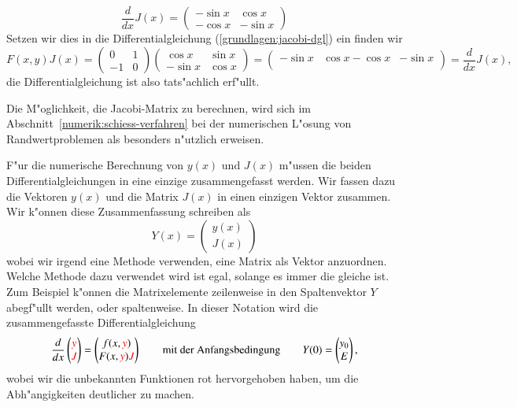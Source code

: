 \begin{beispiel}
\[
\frac{d}{dx}J(x)
=
\begin{pmatrix}
-\sin x& \cos x\\
-\cos x&-\sin x
\end{pmatrix}
\]
Setzen wir dies in die Differentialgleichung (\ref{grundlagen:jacobi-dgl}) ein
finden wir
\[
F(x,y)J(x)
=
\begin{pmatrix}
 0&1\\
-1&0
\end{pmatrix}
\begin{pmatrix}
 \cos x&\sin x\\
-\sin x&\cos x
\end{pmatrix}
=
\begin{pmatrix}
-\sin x& \cos x
-\cos x&-\sin x\\
\end{pmatrix}
=
\frac{d}{dx}J(x),
\]
die Differentialgleichung ist also tats"achlich erf"ullt.
\end{beispiel}
Die M"oglichkeit, die Jacobi-Matrix zu berechnen, wird sich im
Abschnitt~\ref{numerik:schiess-verfahren} bei der numerischen
L"osung von Randwertproblemen als besonders n"utzlich erweisen.

F"ur die numerische Berechnung von $y(x)$ und $J(x)$ m"ussen die
beiden Differentialgleichungen in eine einzige zusammengefasst werden.
Wir fassen dazu die Vektoren $y(x)$ und die Matrix $J(x)$ in einen
einzigen Vektor zusammen. 
Wir k"onnen diese Zusammenfassung schreiben als
\[
Y(x)=\begin{pmatrix}y(x)\\J(x)\end{pmatrix}
\]
wobei wir irgend eine Methode verwenden, eine Matrix als Vektor
anzuordnen.
Welche Methode dazu verwendet wird ist egal, solange es immer die 
gleiche ist.
Zum Beispiel k"onnen die Matrixelemente zeilenweise in den Spaltenvektor
$Y$ abegf"ullt werden, oder spaltenweise.
In dieser Notation wird die zusammengefasste Differentialgleichung
\begin{equation}
\frac{d}{dx}\begin{pmatrix}\color{red}y\\\color{red}J\end{pmatrix}
=
\begin{pmatrix}
f(x,{\color{red}y})\\
F(x,{\color{red}y}) {\color{red}J}
\end{pmatrix}
\qquad
\text{mit der Anfangsbedingung}
\qquad
Y(0)=
\begin{pmatrix}
y_0\\E
\end{pmatrix},
\end{equation}
wobei wir die unbekannten Funktionen rot hervorgehoben haben, um die
Abh"angigkeiten deutlicher zu machen.


